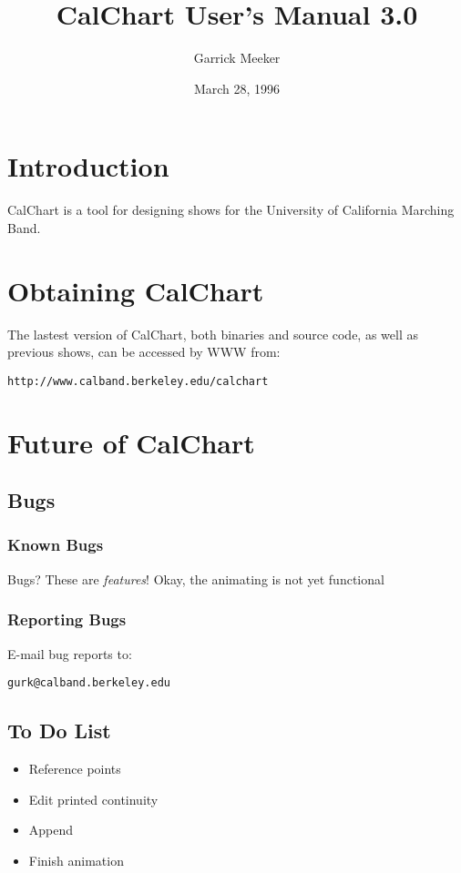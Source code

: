 \title{CalChart User's Manual 3.0}
\author{Garrick Meeker}
\date{March 28, 1996}
\makeindex

\maketitle
\tableofcontents

\chapter{Introduction}

CalChart is a tool for designing shows for the University of California
Marching Band.

\chapter{Obtaining CalChart}

The lastest version of CalChart, both binaries and source code, as well as
previous shows, can be accessed by WWW from:

\begin{verbatim}
http://www.calband.berkeley.edu/calchart
\end{verbatim}

\chapter{Future of CalChart}

\section{Bugs}
\subsection{Known Bugs}
Bugs?  These are {\it features}!
Okay, the animating is not yet functional

\subsection{Reporting Bugs}
E-mail bug reports to:

\begin{verbatim}
gurk@calband.berkeley.edu
\end{verbatim}

\section{To Do List}
\begin{itemize}\itemsep=0pt
\item Reference points
\item Edit printed continuity
\item Append
\item Finish animation
\end{itemize}


